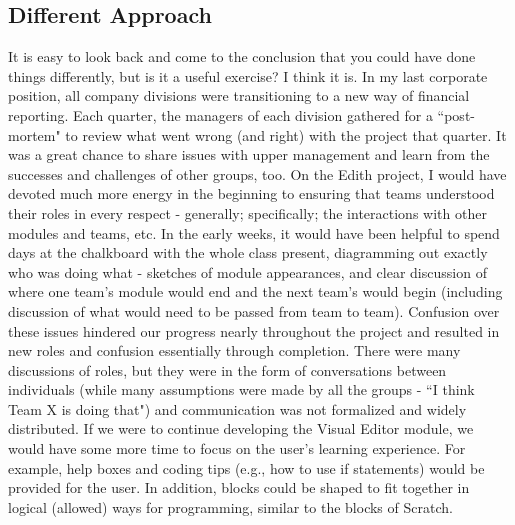 \documentclass[a4paper]{article}
\begin{document}
\subsection{Different Approach}
It is easy to look back and come to the conclusion that you could have done things differently, but is it a useful exercise? I think it is. In my last corporate position, all company divisions were transitioning to a new way of financial reporting. Each quarter, the managers of each division gathered for a ``post-mortem" to review what went wrong (and right) with the project that quarter. It was a great chance to share issues with upper management and learn from the successes and challenges of other groups, too. On the Edith project, I would have devoted much more energy in the beginning to ensuring that teams understood their roles in every respect - generally; specifically; the interactions with other modules and teams, etc. In the early weeks, it would have been helpful to spend days at the chalkboard with the whole class present, diagramming out exactly who was doing what - sketches of module appearances, and clear discussion of where one team's module would end and the next team's would begin (including discussion of what would need to be passed from team to team). Confusion over these issues hindered our progress nearly throughout the project and resulted in new roles and confusion essentially through completion. There were many discussions of roles, but they were in the form of conversations between individuals (while many assumptions were made by all the groups - ``I think Team X is doing that") and communication was not formalized and widely distributed. If we were to continue developing the Visual Editor module, we would have some more time to focus on the user's learning experience. For example, help boxes and coding tips (e.g., how to use if statements) would be provided for the user. In addition, blocks could be shaped to fit together in logical (allowed) ways for programming, similar to the blocks of Scratch. 
\end{document}
